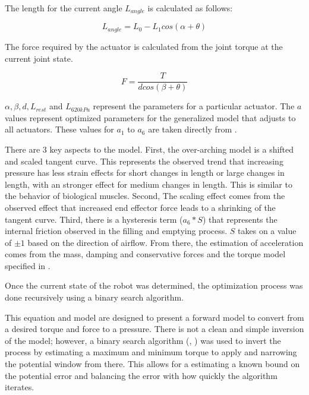 The length for the current angle $L_{angle}$ is calculated as follows:

\begin{equation}
L_{angle} = L_{0} - L_{1} cos \left(\alpha + \theta \right)
\end{equation}

The force required by the actuator is calculated from the joint torque at the current joint state.

\begin{equation}
F = \dfrac{T}{d cos \left(\beta + \theta \right)}
\end{equation}

$\alpha, \beta, d, L_{rest}$ and $L_{620 kPa}$ represent the parameters for a 
particular actuator. The $a$ values represent optimized parameters
for the generalized model that adjusts to all actuators. These values for $a_{1}$ to $a_{6}$ are taken directly from \cite{HuntPMuscles}.

There are 3 key aspects to the model. First, the over-arching model is a shifted and 
scaled tangent curve. This represents the observed trend that increasing 
pressure has less strain effects for short changes in length or large changes in 
length, with an stronger effect for medium changes in length. This is similar to 
the behavior of biological muscles. Second, The scaling effect comes from the observed
effect that increased end effector force leads to a shrinking of the tangent 
curve. Third, there is a hysteresis term ($a_{6} * S$) that represents the internal
friction observed in the filling and emptying process. $S$ takes on a value of $\pm 1$ based on the direction of airflow.
From there, the estimation of acceleration comes from the mass, 
damping and conservative forces and the torque model specified in
.


Once the current state of the robot was determined, the optimization process was 
done recursively using a binary search algorithm. 

This equation and model are designed to present a forward model to convert from 
a desired torque and force to a pressure. There is not a clean and simple 
inversion of the model; however, a binary search algorithm 
(, ) was used to invert 
the process by estimating a maximum and minimum torque to apply and narrowing 
the
potential window from there. This allows for a estimating a known bound on the 
potential error and balancing the error with how quickly the algorithm iterates.

